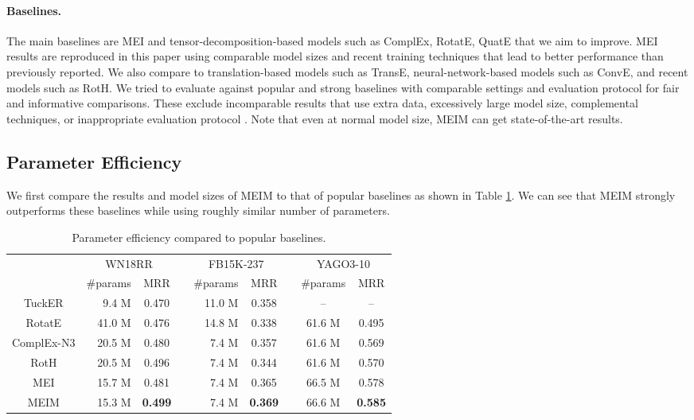 \documentclass{article}
\theoremstyle{plain}
\theoremstyle{remark}
\begin{document}
\paragraph{Baselines.} The main baselines are MEI and tensor-decomposition-based models such as ComplEx, RotatE, QuatE that we aim to improve. MEI results are reproduced in this paper using comparable model sizes and recent training techniques that lead to better performance than previously reported. We also compare to translation-based models such as TransE, neural-network-based models such as ConvE, and recent models such as RotH. We tried to evaluate against popular and strong baselines with comparable settings and evaluation protocol for fair and informative comparisons. These exclude incomparable results that use extra data, excessively large model size, complemental techniques, or inappropriate evaluation protocol \cite{sun_reevaluationknowledgegraph_2020}. Note that even at normal model size, MEIM can get state-of-the-art results.

\subsection{Parameter Efficiency}
We first compare the results and model sizes of MEIM to that of popular baselines as shown in Table \ref{tab:param_efficiency}. We can see that MEIM strongly outperforms these baselines while using roughly similar number of parameters. 

\begin{table}[t]
	\centering  
	\begin{adjustbox}{max width=\linewidth}
		\begin{tabular}{@{\extracolsep{-8pt}}crclrclcc}


			& \multicolumn{2}{c}{WN18RR} && \multicolumn{2}{c}{FB15K-237} && \multicolumn{2}{c}{YAGO3-10} \\
			\cmidrule{2-3} \cmidrule{5-6} \cmidrule{8-9}
			& \#params & MRR && \#params & MRR && \#params & MRR \\
\cmidrule{1-3} \cmidrule{5-6} \cmidrule{8-9}
			
			TuckER & 9.4 M & 0.470 && 11.0 M & 0.358 && -- & -- \\
			RotatE & 41.0 M & 0.476 && 14.8 M & 0.338 && 61.6 M & 0.495 \\
			ComplEx-N3 & 20.5 M & 0.480 && 7.4 M & 0.357 && 61.6 M & 0.569 \\
			RotH & 20.5 M & 0.496 && 7.4 M & 0.344 && 61.6 M & 0.570 \\
			


MEI & 15.7 M & 0.481 && 7.4 M & 0.365 && 66.5 M & 0.578 \\
			
			\midrule
			
			MEIM & 15.3 M & \textbf{0.499} && 7.4 M & \textbf{0.369} && 66.6 M & \textbf{0.585} \\
			
\end{tabular}
	\end{adjustbox}
	\caption[]{Parameter efficiency compared to popular baselines.}
	\label{tab:param_efficiency}
\end{table}
\end{document}
